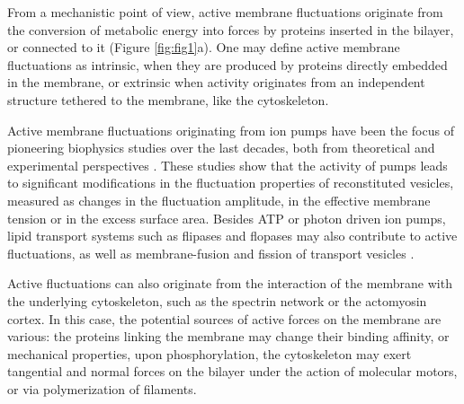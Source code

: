 \documentclass[graybox]{svmult}
\begin{document}
From a mechanistic point of view, active membrane fluctuations originate from the conversion of metabolic energy into forces by proteins inserted in the bilayer, or connected to it (Figure \ref{fig:fig1}a). One may define active membrane fluctuations as intrinsic, when they are produced by proteins directly embedded in the membrane, or extrinsic when activity originates from an independent structure tethered to the membrane, like the cytoskeleton.

Active membrane fluctuations originating from ion pumps have been the focus of pioneering biophysics studies over the last decades, both from theoretical \cite{Prost:1996, Ramaswamy:2000, Lin:2006} and experimental perspectives \cite{Manneville:1999, Manneville:2001, Faris:2009, Girard:2005}. These studies show that the activity of pumps leads to significant modifications in the fluctuation properties of reconstituted vesicles, measured as changes in the fluctuation amplitude, in the effective membrane tension or in the excess surface area. Besides ATP or photon driven ion pumps, lipid transport systems such as flipases and flopases \cite{Hankins:2015} may also contribute to active fluctuations, as well as membrane-fusion and fission of transport vesicles \cite{Rao:2001}. 

Active fluctuations can also originate from the interaction of the membrane with the underlying cytoskeleton, such as the spectrin network or the actomyosin cortex. In this case, the potential sources of active forces on the membrane are various: the proteins linking the membrane may change their binding affinity, or mechanical properties, upon phosphorylation, the cytoskeleton may exert tangential and normal forces on the bilayer under the action of molecular motors, or via polymerization of filaments.
\\



\end{document}
